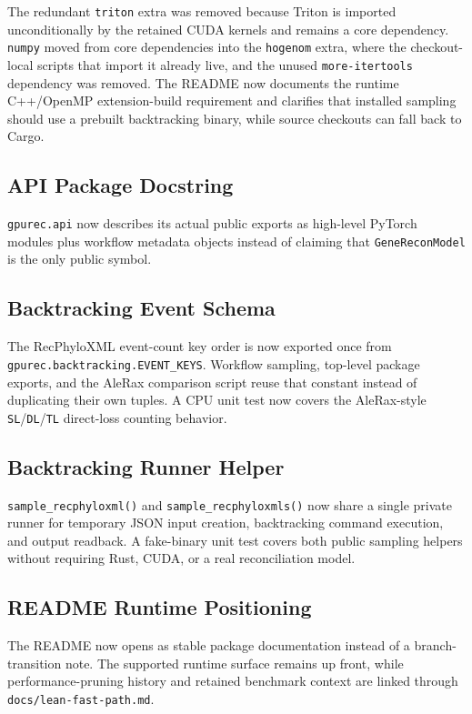\documentclass[11pt]{article}
\begin{document}
The redundant \texttt{triton} extra was removed because Triton is imported
unconditionally by the retained CUDA kernels and remains a core dependency.
\texttt{numpy} moved from core dependencies into the \texttt{hogenom} extra,
where the checkout-local scripts that import it already live, and the unused
\texttt{more-itertools} dependency was removed.  The README now documents the
runtime C++/OpenMP extension-build requirement and clarifies that installed
sampling should use a prebuilt backtracking binary, while source checkouts can
fall back to Cargo.

\subsection{API Package Docstring}

\texttt{gpurec.api} now describes its actual public exports as high-level
PyTorch modules plus workflow metadata objects instead of claiming that
\texttt{GeneReconModel} is the only public symbol.

\subsection{Backtracking Event Schema}

The RecPhyloXML event-count key order is now exported once from
\texttt{gpurec.backtracking.EVENT\_KEYS}.  Workflow sampling, top-level package
exports, and the AleRax comparison script reuse that constant instead of
duplicating their own tuples.  A CPU unit test now covers the AleRax-style
\texttt{SL}/\texttt{DL}/\texttt{TL} direct-loss counting behavior.

\subsection{Backtracking Runner Helper}

\texttt{sample\_recphyloxml()} and \texttt{sample\_recphyloxmls()} now share a
single private runner for temporary JSON input creation, backtracking command
execution, and output readback.  A fake-binary unit test covers both public
sampling helpers without requiring Rust, CUDA, or a real reconciliation model.

\subsection{README Runtime Positioning}

The README now opens as stable package documentation instead of a
branch-transition note.  The supported runtime surface remains up front, while
performance-pruning history and retained benchmark context are linked through
\texttt{docs/lean-fast-path.md}.
\end{document}
